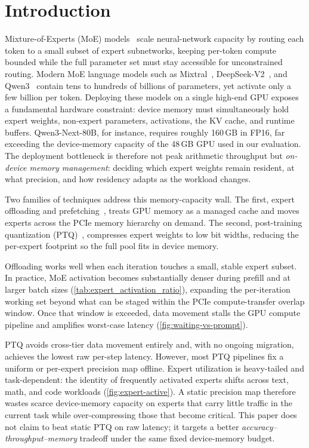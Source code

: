 \section{Introduction}

Mixture-of-Experts (MoE) models~\cite{shazeer2017outrageously} scale neural-network capacity by routing each token to a small subset of expert subnetworks, keeping per-token compute bounded while the full parameter set must stay accessible for unconstrained routing. Modern MoE language models such as Mixtral~\cite{jiang2024mixtral}, DeepSeek-V2~\cite{deepseekv2}, and Qwen3~\cite{qwen3technicalreport} contain tens to hundreds of billions of parameters, yet activate only a few billion per token. Deploying these models on a single high-end GPU exposes a fundamental hardware constraint: device memory must simultaneously hold expert weights, non-expert parameters, activations, the KV cache, and runtime buffers. Qwen3-Next-80B, for instance, requires roughly 160\,GB in FP16, far exceeding the device-memory capacity of the 48\,GB GPU used in our evaluation. The deployment bottleneck is therefore not peak arithmetic throughput but \emph{on-device memory management}: deciding which expert weights remain resident, at what precision, and how residency adapts as the workload changes.

Two families of techniques address this memory-capacity wall.
The first, expert offloading and prefetching~\cite{li2023adaptive,yi2023edgemoe,xue2024moe,eliseev2023fast,hwang2024pre,zhong2024adapmoe,tang2024hobbit,song2024promoe,shen2025expertflow}, treats GPU memory as a managed cache and moves experts across the PCIe memory hierarchy on demand.
The second, post-training quantization (PTQ)~\cite{lin2024awq,frantar2022gptq,kim2023mixturequantizedexpertsmoqe,duanmu2025mxmoe}, compresses expert weights to low bit widths, reducing the per-expert footprint so the full pool fits in device memory.

Offloading works well when each iteration touches a small, stable expert subset. In practice, MoE activation becomes substantially denser during prefill and at larger batch sizes (\autoref{tab:expert_activation_ratio}), expanding the per-iteration working set beyond what can be staged within the PCIe compute-transfer overlap window. Once that window is exceeded, data movement stalls the GPU compute pipeline and amplifies worst-case latency (\autoref{fig:waiting-vs-prompt}).

PTQ avoids cross-tier data movement entirely and, with no ongoing migration, achieves the lowest raw per-step latency. However, most PTQ pipelines fix a uniform or per-expert precision map offline. Expert utilization is heavy-tailed and task-dependent: the identity of frequently activated experts shifts across text, math, and code workloads (\autoref{fig:expert-active}). A static precision map therefore wastes scarce device-memory capacity on experts that carry little traffic in the current task while over-compressing those that become critical. This paper does not claim to beat static PTQ on raw latency; it targets a better \emph{accuracy--throughput--memory} tradeoff under the same fixed device-memory budget.

